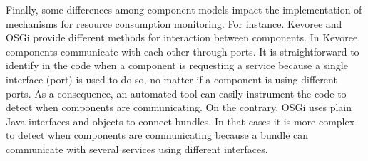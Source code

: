 Finally, some differences among component models impact the implementation of mechanisms for resource consumption monitoring.
For instance. Kevoree and OSGi provide different methods for interaction between components.
In Kevoree, components communicate with each other through ports.
It is straightforward to identify in the code when a component is requesting a service because a single interface (port) is used to do so, no matter if a component is using different ports. 
As a consequence, an automated tool can easily instrument the code to detect when components are communicating.
On the contrary, OSGi uses plain Java interfaces and objects to connect bundles.
In that cases it is more complex to detect when components are communicating because a bundle can communicate with several services using different interfaces. 

%


